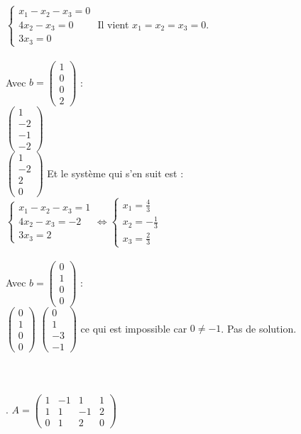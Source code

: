 \documentclass[11pt, fleqn]{report}
\begin{document}
$ \begin{cases}
	x_1-x_2-x_3 = 0\\
	4x_2-x_3 = 0\\
	3x_3 = 0
\end{cases} $ Il vient $x_1=x_2=x_3=0.$
\\
\\
Avec $b=\left(\begin{array}{c}1 \\0 \\0 \\2\end{array}\right)$ :
\\
$\left(\begin{array}{c}1 \\-2 \\-1 \\-2\end{array}\right)$
\\
$\left(\begin{array}{c}1 \\-2 \\2 \\0\end{array}\right)$ Et le système qui s'en suit est :
\\
$ \begin{cases}
	x_1-x_2-x_3 = 1\\
	4x_2-x_3 = -2\\
	3x_3 = 2
\end{cases}
\Leftrightarrow
\begin{cases}
	x_1 = \frac{4}{3}\\
	x_2= -\frac{1}{3}\\
	x_3 = \frac{2}{3}
\end{cases} $
\\
\\
Avec $b=\left(\begin{array}{c}0 \\1 \\0 \\0\end{array}\right)$ :
\\
$\left(\begin{array}{c}0 \\1 \\0 \\0\end{array}\right)$
$\left(\begin{array}{c}0 \\1 \\-3 \\-1\end{array}\right)$ ce qui est impossible car $0\neq-1$. Pas de solution.
\\
\\
\\
\\
. $ A=\left(\begin{array}{cccc}1 & -1 & 1 & 1 \\1 & 1 & -1 & 2 \\0 & 1 & 2 & 0\end{array}\right) $
\\
\\
\end{document}
